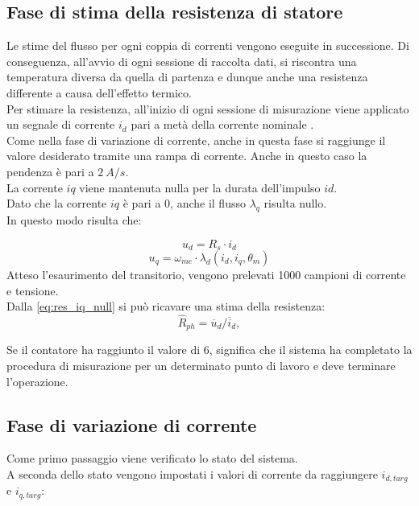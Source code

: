 \subsection{Fase di stima della resistenza di statore}
Le stime del flusso per ogni coppia di correnti vengono eseguite in successione. Di conseguenza, all'avvio di ogni sessione di raccolta dati, si riscontra una temperatura diversa da quella di partenza e dunque anche una resistenza differente a causa dell'effetto termico.\\
Per stimare la resistenza, all'inizio di ogni sessione di misurazione viene applicato un segnale di corrente $i_d$ pari a metà della corrente nominale \cite{Gierczynski}. \\
Come nella fase di variazione di corrente, anche in questa fase si raggiunge il valore desiderato tramite una rampa di corrente. Anche in questo caso la pendenza è pari a $2 \ A/s$.\\
La corrente $iq$ viene mantenuta nulla per la durata dell'impulso $id$.\\
Dato che la corrente $iq$ è pari a 0, anche il flusso $\lambda_q$ risulta nullo.\\
In questo modo risulta che:


\begin{equation}
    u_d = R_{s}\cdot i_d
\label{eq:res_iq_null}
\end{equation}
\begin{equation}
    u_q = \omega_{me}\cdot\lambda_d(i_d,i_q,\theta_m)
\end{equation}
Atteso l'esaurimento del transitorio, vengono prelevati 1000 campioni di corrente e tensione.\\
Dalla \ref{eq:res_iq_null} si può ricavare una stima della resistenza:
\begin{equation}
\hat{R}_{ph} = \overline{u}_d / \overline{i}_d , 
\end{equation}


Se il contatore ha raggiunto il valore di 6, significa che il sistema ha completato la procedura di misurazione per un determinato punto di lavoro e deve terminare l'operazione.

\subsection{Fase di variazione di corrente}
Come primo passaggio viene verificato lo stato del sistema.\\
A seconda dello stato vengono impostati i valori di corrente da raggiungere $i_{d,targ}$ e $i_{q,targ}$:

